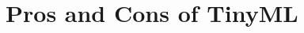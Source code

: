 \documentclass[../main]{subfiles}
\begin{document}
\chapter{Pros and Cons of TinyML} \label{chp:benefitsTinyML}





% 

% 

% 
\end{document}
